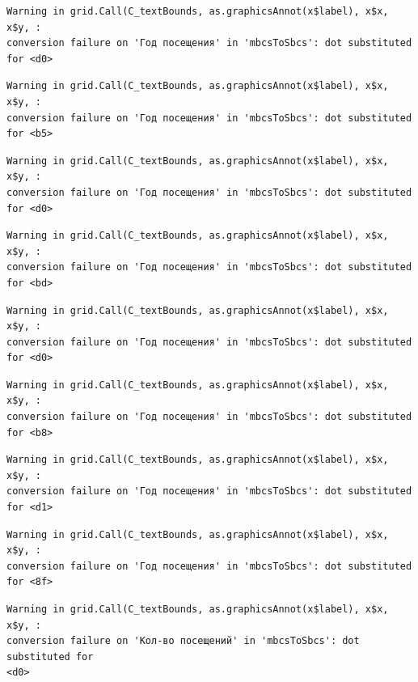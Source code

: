\documentclass[
  letterpaper,
  DIV=11,
  numbers=noendperiod]{scrartcl}
\begin{document}
\begin{verbatim}
Warning in grid.Call(C_textBounds, as.graphicsAnnot(x$label), x$x, x$y, :
conversion failure on 'Год посещения' in 'mbcsToSbcs': dot substituted for <d0>
\end{verbatim}

\begin{verbatim}
Warning in grid.Call(C_textBounds, as.graphicsAnnot(x$label), x$x, x$y, :
conversion failure on 'Год посещения' in 'mbcsToSbcs': dot substituted for <b5>
\end{verbatim}

\begin{verbatim}
Warning in grid.Call(C_textBounds, as.graphicsAnnot(x$label), x$x, x$y, :
conversion failure on 'Год посещения' in 'mbcsToSbcs': dot substituted for <d0>
\end{verbatim}

\begin{verbatim}
Warning in grid.Call(C_textBounds, as.graphicsAnnot(x$label), x$x, x$y, :
conversion failure on 'Год посещения' in 'mbcsToSbcs': dot substituted for <bd>
\end{verbatim}

\begin{verbatim}
Warning in grid.Call(C_textBounds, as.graphicsAnnot(x$label), x$x, x$y, :
conversion failure on 'Год посещения' in 'mbcsToSbcs': dot substituted for <d0>
\end{verbatim}

\begin{verbatim}
Warning in grid.Call(C_textBounds, as.graphicsAnnot(x$label), x$x, x$y, :
conversion failure on 'Год посещения' in 'mbcsToSbcs': dot substituted for <b8>
\end{verbatim}

\begin{verbatim}
Warning in grid.Call(C_textBounds, as.graphicsAnnot(x$label), x$x, x$y, :
conversion failure on 'Год посещения' in 'mbcsToSbcs': dot substituted for <d1>
\end{verbatim}

\begin{verbatim}
Warning in grid.Call(C_textBounds, as.graphicsAnnot(x$label), x$x, x$y, :
conversion failure on 'Год посещения' in 'mbcsToSbcs': dot substituted for <8f>
\end{verbatim}

\begin{verbatim}
Warning in grid.Call(C_textBounds, as.graphicsAnnot(x$label), x$x, x$y, :
conversion failure on 'Кол-во посещений' in 'mbcsToSbcs': dot substituted for
<d0>
\end{verbatim}
\end{document}
